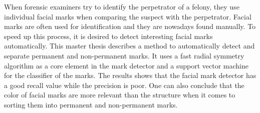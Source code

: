 When forensic examiners try to identify the perpetrator of a felony, they use individual facial marks when comparing the suspect with the perpetrator. Facial marks are often used for identification and they are nowadays  found manually. To speed up this process, it is desired to detect interesting facial marks automatically. This master thesis describes a method to automatically detect and separate permanent and non-permanent marks. It uses a fast radial symmetry algorithm as a core element in the mark detector and a support vector machine for the classifier of the marks. The results shows that the facial mark detector has a good recall value while the precision is poor. One can also conclude that the color of facial marks are more relevant than the structure when it comes to sorting them into permanent and non-permanent marks.
